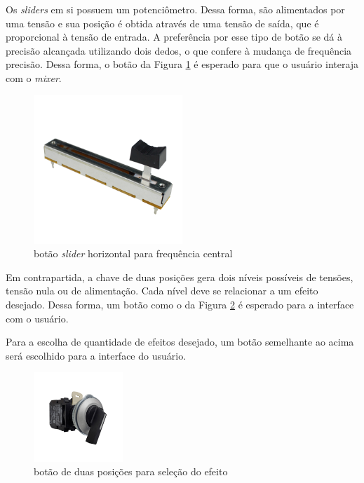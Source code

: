     Os \textit{sliders} em si possuem um potenciômetro. Dessa forma, são alimentados por uma tensão e sua posição é obtida através de uma tensão de saída, que é proporcional à tensão de entrada. A preferência por esse tipo de botão se dá à precisão alcançada utilizando dois dedos, o que confere à mudança de frequência precisão. Dessa forma, o botão da Figura \ref{fig61} é esperado para que o usuário interaja com o \textit{mixer}. 
    
    \begin{figure}[h]
        \centering
        \includegraphics[width=0.5\textwidth]{figuras/fig61.png}
        \caption{botão \textit{slider} horizontal para frequência central}
        \label{fig61}
    \end{figure}

    Em contrapartida, a chave de duas posições gera dois níveis possíveis de tensões, tensão nula ou de alimentação. Cada nível deve se relacionar a um efeito desejado. Dessa forma, um botão como o da Figura \ref{fig62} é esperado para a interface com o usuário.

    Para a escolha de quantidade de efeitos desejado, um botão semelhante ao acima será escolhido para a interface do usuário.

    \begin{figure}[h]
        \centering
        \includegraphics[width=0.3\textwidth]{figuras/fig62.png}
        \caption{botão de duas posições para seleção do efeito}
        \label{fig62}
    \end{figure}


